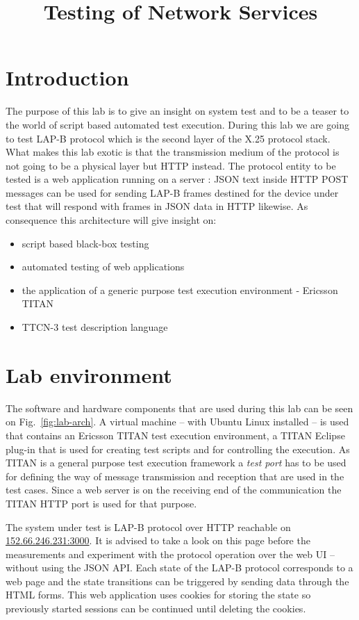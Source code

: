 \documentclass[a4paper]{article}
\title{Testing of Network Services}
\author{}
\date{}
\begin{document}
\maketitle

\tableofcontents

\section{Introduction}

The purpose of this lab is to give an insight on system test and to be a teaser to the world of script based automated test execution. During this lab we are going to test LAP-B protocol which is the second layer of the X.25 protocol stack. What makes this lab exotic is that the transmission medium of the protocol is not going to be a physical layer but HTTP instead. The protocol entity to be tested is a web application running on a server : JSON text inside HTTP POST messages can be used for sending LAP-B frames destined for the device under test that will respond with frames in  JSON data in HTTP likewise. As consequence this architecture will give insight on:
\begin{itemize}
  \item script based black-box testing
  \item automated testing of web applications
  \item the application of a generic purpose test execution environment - Ericsson TITAN
  \item TTCN-3 test description language
\end{itemize}

\section{Lab environment}

The software and hardware components that are used during this lab can be seen on Fig.~\ref{fig:lab-arch}.
A virtual machine -- with Ubuntu Linux installed -- is used that contains an Ericsson TITAN test execution environment, a TITAN Eclipse plug-in that is used for creating test scripts and for controlling the execution. As TITAN is a general purpose test execution framework a \emph{test port} has to be used for defining the way of message transmission and reception that are used in the test cases. Since a web server is on the receiving end of the communication the TITAN HTTP port is used for that purpose.

The system under test is LAP-B protocol over HTTP reachable on \url{152.66.246.231:3000}. It is advised to take a look on this page before the measurements and experiment with the protocol operation over the web UI -- without using the JSON API.
Each state of the LAP-B protocol corresponds to a web page and the state transitions can be triggered by sending data through the HTML forms.
This web application uses cookies for storing the state so previously started sessions can be continued until deleting the cookies.
\end{document}
